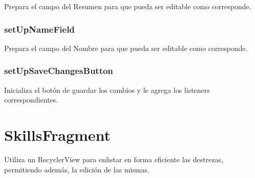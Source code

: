 \documentclass[letterpaper,10pt,english]{sphinxmanual}
\begin{document}
\begin{fulllineitems}
\label{Fragments/ProfileFragment:com.fiuba.tallerii.jobify.ProfileFragment.setUpResumeField(View)}
Prepara el campo del Resumen para que pueda ser editable como corresponde.

\end{fulllineitems}



\subsubsection{setUpNameField}
\label{Fragments/ProfileFragment:setupnamefield}

\begin{fulllineitems}
\label{Fragments/ProfileFragment:com.fiuba.tallerii.jobify.ProfileFragment.setUpNameField(View)}
Prepara el campo del Nombre para que pueda ser editable como corresponde.

\end{fulllineitems}



\subsubsection{setUpSaveChangesButton}
\label{Fragments/ProfileFragment:setupsavechangesbutton}

\begin{fulllineitems}
\label{Fragments/ProfileFragment:com.fiuba.tallerii.jobify.ProfileFragment.setUpSaveChangesButton(View)}
Inicializa el botón de guardar los cambios y le agrega los listeners correspondientes.

\end{fulllineitems}



\section{SkillsFragment}
\label{Fragments/SkillsFragment:skillsfragment}\label{Fragments/SkillsFragment::doc}

\begin{fulllineitems}
\label{Fragments/SkillsFragment:com.fiuba.tallerii.jobify.SkillsFragment}
Utiliza un RecyclerView para enlistar en forma eficiente las destrezas, permitiendo además, la edición de las mismas.

\end{fulllineitems}
\end{document}
